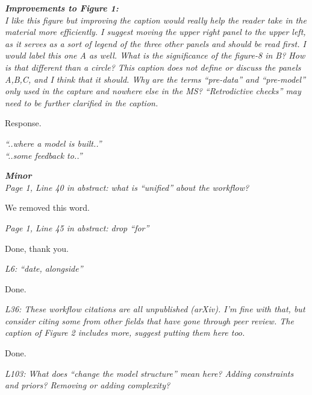 \documentclass[11pt,letter]{article}
\begin{document}
\begin{mybox}
\emph{\textbf{Improvements to Figure 1:}\\
I like this figure but improving the caption would really help the reader take in the material more efficiently. I suggest moving the upper right panel to the upper left, as it serves as a sort of legend of the three other panels and should be read first. I would label this one A as well. What is the significance of the figure-8 in B? How is that different than a circle? This caption does not define or discuss the panels A,B,C, and I think that it should. Why are the terms “pre-data” and “pre-model” only used in the capture and nowhere else in the MS? “Retrodictive checks” may need to be further clarified in the caption.}
\end{mybox}

Response.

\begin{mybox}
\emph{“..where a model is built..”\\
“..some feedback to..”}
\end{mybox}

\begin{mybox}
\emph{\textbf{Minor}\\
Page 1, Line 40 in abstract: what is “unified” about the workflow?}
\end{mybox}

We removed this word.

\begin{mybox}
\emph{Page 1, Line 45 in abstract: drop “for”}
\end{mybox}

Done, thank you.

\begin{mybox}
\emph{L6: “date, alongside”}
\end{mybox}

Done.

\begin{mybox}
\emph{L36: These workflow citations are all unpublished (arXiv). I’m fine with that, but consider citing some from other fields that have gone through peer review. The caption of Figure 2 includes more, suggest putting them here too.}
\end{mybox}

Done.

\begin{mybox}
\emph{L103: What does “change the model structure” mean here? Adding constraints and priors? Removing or adding complexity?}
\end{mybox}
\end{document}
